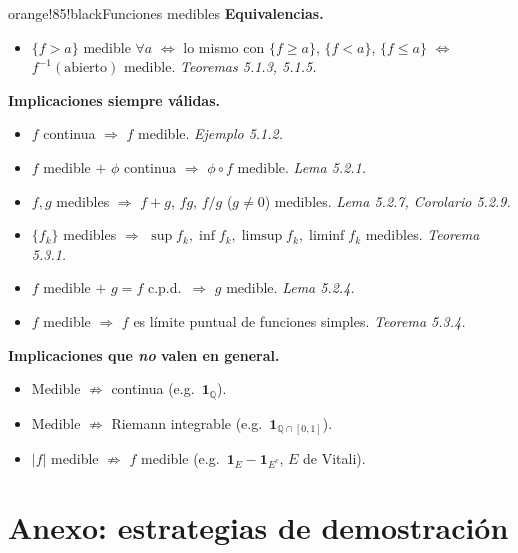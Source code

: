 \documentclass[11pt,twoside]{article}
\newcommand{\Q}{\mathbb{Q}}
\newcommand{\ind}{\mathbf{1}}                 %
\begin{document}
\begin{equivbox}{orange!85!black}{Funciones medibles}
\textbf{Equivalencias.}
\begin{itemize}[leftmargin=2em,itemsep=2pt]
\item $\{f > a\}$ medible $\forall a$ $\Leftrightarrow$ lo mismo con $\{f \geq a\}$, $\{f < a\}$, $\{f \leq a\}$ $\Leftrightarrow$ $f^{-1}(\text{abierto})$ medible. \hfill\textit{Teoremas 5.1.3, 5.1.5.}
\end{itemize}
\textbf{Implicaciones siempre v\'alidas.}
\begin{itemize}[leftmargin=2em,itemsep=2pt]
\item $f$ continua $\Rightarrow$ $f$ medible. \hfill\textit{Ejemplo 5.1.2.}
\item $f$ medible $+$ $\phi$ continua $\Rightarrow$ $\phi \circ f$ medible. \hfill\textit{Lema 5.2.1.}
\item $f, g$ medibles $\Rightarrow$ $f + g$, $fg$, $f/g$ ($g \neq 0$) medibles. \hfill\textit{Lema 5.2.7, Corolario 5.2.9.}
\item $\{f_{k}\}$ medibles $\Rightarrow$ $\sup f_{k}, \inf f_{k}, \limsup f_{k}, \liminf f_{k}$ medibles. \hfill\textit{Teorema 5.3.1.}
\item $f$ medible $+$ $g = f$ c.p.d.\ $\Rightarrow$ $g$ medible. \hfill\textit{Lema 5.2.4.}
\item $f$ medible $\Rightarrow$ $f$ es l\'imite puntual de funciones simples. \hfill\textit{Teorema 5.3.4.}
\end{itemize}
\textbf{Implicaciones que \emph{no} valen en general.}
\begin{itemize}[leftmargin=2em,itemsep=2pt]
\item Medible $\not\Rightarrow$ continua (e.g.\ $\ind_{\Q}$).
\item Medible $\not\Rightarrow$ Riemann integrable (e.g.\ $\ind_{\Q \cap [0,1]}$).
\item $|f|$ medible $\not\Rightarrow$ $f$ medible (e.g.\ $\ind_{E} - \ind_{E^{c}}$, $E$ de Vitali).
\end{itemize}
\end{equivbox}

\newpage
\section{Anexo: estrategias de demostraci\'on}
\end{document}
